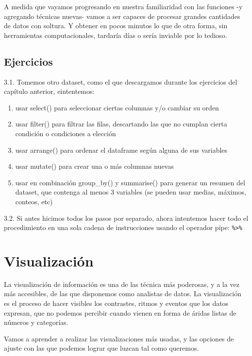 \documentclass[spanish,]{book}
\providecommand{\tightlist}{%
  \setlength{\itemsep}{0pt}\setlength{\parskip}{0pt}}
\begin{document}
A medida que vayamos progresando en nuestra familiaridad con las funciones -y agregando técnicas nuevas- vamos a ser capaces de procesar grandes cantidades de datos con soltura. Y obtener en pocos minutos lo que de otra forma, sin herramientas computacionales, tardaría días o sería inviable por lo tedioso.

\hypertarget{ejercicios-1}{%
\section{Ejercicios}\label{ejercicios-1}}

3.1. Tomemos otro dataset, como el que descargamos durante los ejercicios del capítulo anterior, eintentemos:

\begin{enumerate}
\def\labelenumi{\Roman{enumi}.}
\tightlist
\item
  usar select() para seleccionar ciertas columnas y/o cambiar su orden
\item
  usar filter() para filtrar las filas, descartando las que no cumplan cierta condición o condiciones a elección
\item
  usar arrange() para ordenar el dataframe según alguna de sus variables
\item
  usar mutate() para crear una o más columnas nuevas
\item
  usar en combinación group\_by() y summarise() para generar un resumen del dataset, que contenga al menos 3 variables (se pueden usar medias, máximos, conteos, etc)
\end{enumerate}

3.2. Si antes hicimos todos los pasos por separado, ahora intentemos hacer todo el procedimiento en una sola cadena de instrucciones usando el operador pipe: \texttt{\%\textgreater{}\%}

\hypertarget{visualizaciuxf3n}{%
\chapter{Visualización}\label{visualizaciuxf3n}}

La visualización de información es una de las técnica más poderosas, y a la vez más accesibles, de las que disponemos como analistas de datos. La visualización es el proceso de hacer visibles los contrastes, ritmos y eventos que los datos expresan, que no podemos percibir cuando vienen en forma de áridas listas de números y categorías.

Vamos a aprender a realizar las visualizaciones más usadas, y las opciones de ajuste con las que podemos lograr que luzcan tal como queremos.
\end{document}
